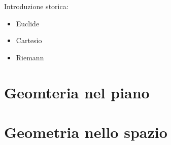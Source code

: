 
Introduzione storica:
\begin{itemize}
  \item Euclide
  \item Cartesio
  \item Riemann
\end{itemize}

\chapter{Geomteria nel piano}

\chapter{Geometria nello spazio}


